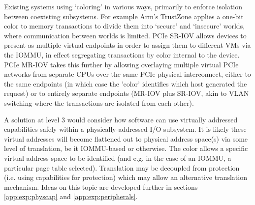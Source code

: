 Existing systems using `coloring' in various ways, primarily to enforce isolation between coexisting subsystems.
For example Arm's TrustZone\cite{trustzone-cortexa} applies a one-bit color to memory transactions to divide them into `secure' and `insecure' worlds, where communication between worlds is limited.
PCIe SR-IOV\cite{pcie-sriov} allows devices to present as multiple virtual endpoints in order to assign them to different VMs via the IOMMU, in effect segregating transactions by color internal to the device.
PCIe MR-IOV\cite{pcie-mriov} takes this further by allowing overlaying multiple virtual PCIe networks from separate CPUs over the same PCIe physical interconnect, either to the same endpoints (in which case the 'color' identifies which host generated the request) or to entirely separate endpoints (MR-IOV plus SR-IOV, akin to VLAN switching where the transactions are isolated from each other).

A solution at level 3 would consider how software can use virtually addressed capabilities safely within a physically-addressed I/O subsystem.
It is likely these virtual addresses will become flattened out to physical address space(s) via some level of translation, be it IOMMU-based or otherwise.
The color allows a specific virtual address space to be identified (and e.g. in the case of an IOMMU, a particular page table selected).
Translation may be decoupled from protection (i.e. using capabilities for protection) which may allow an alternative translation mechanism.
Ideas on this topic are developed further in sections \ref{app:exp:physcap} and \ref{app:exp:peripherals}.
